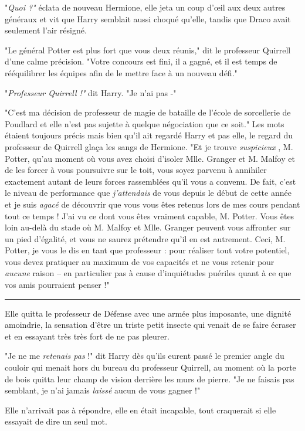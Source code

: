 "\emph{Quoi ?"}  éclata de nouveau Hermione, elle jeta un coup d'œil aux deux autres généraux et vit que Harry semblait aussi choqué qu'elle, tandis que Draco avait seulement l'air résigné.

"Le général Potter est plus fort que vous deux réunis," dit le professeur Quirrell d'une calme précision. "Votre concours est fini, il a gagné, et il est temps de rééquilibrer les équipes afin de le mettre face à un nouveau défi."

"\emph{Professeur Quirrell !"}  dit Harry. "Je n'ai pas -"

"C'est ma décision de professeur de magie de bataille de l'école de sorcellerie de Poudlard et elle n'est pas sujette à quelque négociation que ce soit." Les mots étaient toujours précis mais bien qu'il ait regardé Harry et pas elle, le regard du professeur de Quirrell glaça les sangs de Hermione. "Et je trouve \emph{suspicieux} , M. Potter, qu'au moment où vous avez choisi d'isoler Mlle. Granger et M. Malfoy et de les forcer à vous poursuivre sur le toit, vous soyez parvenu à annihiler exactement autant de leurs forces rassemblées qu'il vous a convenu. De fait, c'est le niveau de performance que \emph{j'attendais}  de vous depuis le début de cette année et je suis \emph{agacé}  de découvrir que vous vous êtes retenus lors de mes cours pendant tout ce temps ! J'ai vu ce dont vous êtes vraiment capable, M. Potter. Vous êtes loin au-delà du stade où M. Malfoy et Mlle. Granger peuvent vous affronter sur un pied d'égalité, et vous ne saurez prétendre qu'il en est autrement. Ceci, M. Potter, je vous le dis en tant que professeur : pour réaliser tout votre potentiel, vous devez pratiquer au maximum de vos capacités et ne vous retenir pour \emph{aucune}  raison – en particulier pas à cause d'inquiétudes puériles quant à ce que vos amis pourraient penser !"
\par\noindent\rule{\textwidth}{0.4pt}
Elle quitta le professeur de Défense avec une armée plus imposante, une dignité amoindrie, la sensation d'être un triste petit insecte qui venait de se faire écraser et en essayant très très fort de ne pas pleurer.

"Je ne me \emph{retenais pas } !" dit Harry dès qu'ils eurent passé le premier angle du couloir qui menait hors du bureau du professeur Quirrell, au moment où la porte de bois quitta leur champ de vision derrière les murs de pierre. "Je ne faisais pas semblant, je n'ai jamais \emph{laissé}  aucun de vous gagner !"

Elle n'arrivait pas à répondre, elle en était incapable, tout craquerait si elle essayait de dire un seul mot.

